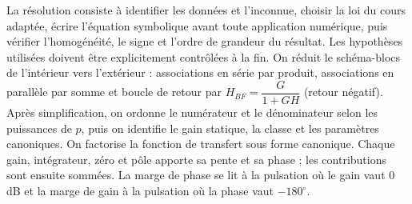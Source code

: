 \begin{corrigebox}[Corrigé]
La résolution consiste à identifier les données et l'inconnue, choisir la loi du cours adaptée, écrire l'équation symbolique avant toute application numérique, puis vérifier l'homogénéité, le signe et l'ordre de grandeur du résultat. Les hypothèses utilisées doivent être explicitement contrôlées à la fin.
On réduit le schéma-blocs de l'intérieur vers l'extérieur : associations en série par produit, associations en parallèle par somme et boucle de retour par $H_{BF}=\dfrac{G}{1+GH}$ (retour négatif). Après simplification, on ordonne le numérateur et le dénominateur selon les puissances de $p$, puis on identifie le gain statique, la classe et les paramètres canoniques.
On factorise la fonction de transfert sous forme canonique. Chaque gain, intégrateur, zéro et pôle apporte sa pente et sa phase ; les contributions sont ensuite sommées. La marge de phase se lit à la pulsation où le gain vaut $0$ dB et la marge de gain à la pulsation où la phase vaut $-180^\circ$.
\end{corrigebox}
